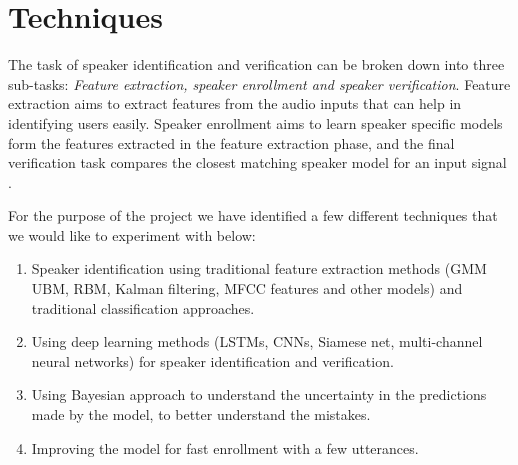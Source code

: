 \documentclass[letterpaper]{article}
\begin{document}
\section{Techniques}

The task of speaker identification and verification can be broken down into three sub-tasks: \textit{Feature extraction, speaker enrollment and speaker verification}.
Feature extraction aims to extract features from the audio inputs that can help in identifying users easily.
Speaker enrollment aims to learn speaker specific models form the features extracted in the feature extraction phase, and the final verification task compares the closest matching speaker model for an input signal \cite{sv-cnn}.

For the purpose of the project we have identified a few different techniques that we would like to experiment with below:
\begin{enumerate}
	\item Speaker identification using traditional feature extraction methods (GMM UBM, RBM, Kalman filtering, MFCC features  and other models) and traditional classification approaches.
	
	\item Using deep learning methods  (LSTMs, CNNs, Siamese net,  multi-channel neural networks) for speaker identification and verification.
	
	\item Using Bayesian approach to understand the uncertainty in the predictions made by the model, to better understand the mistakes.
	
	\item Improving the model for fast enrollment with a few utterances.

\end{enumerate}



    
\end{document}
